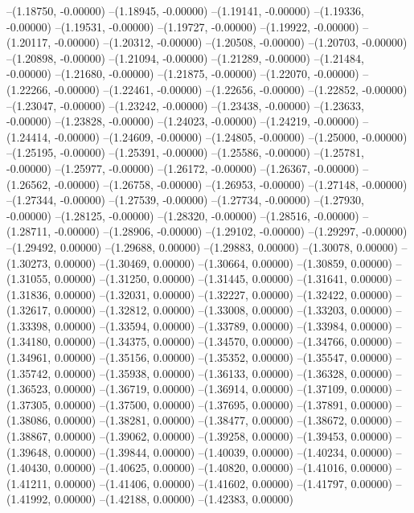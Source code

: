 --(1.18750, -0.00000)
--(1.18945, -0.00000)
--(1.19141, -0.00000)
--(1.19336, -0.00000)
--(1.19531, -0.00000)
--(1.19727, -0.00000)
--(1.19922, -0.00000)
--(1.20117, -0.00000)
--(1.20312, -0.00000)
--(1.20508, -0.00000)
--(1.20703, -0.00000)
--(1.20898, -0.00000)
--(1.21094, -0.00000)
--(1.21289, -0.00000)
--(1.21484, -0.00000)
--(1.21680, -0.00000)
--(1.21875, -0.00000)
--(1.22070, -0.00000)
--(1.22266, -0.00000)
--(1.22461, -0.00000)
--(1.22656, -0.00000)
--(1.22852, -0.00000)
--(1.23047, -0.00000)
--(1.23242, -0.00000)
--(1.23438, -0.00000)
--(1.23633, -0.00000)
--(1.23828, -0.00000)
--(1.24023, -0.00000)
--(1.24219, -0.00000)
--(1.24414, -0.00000)
--(1.24609, -0.00000)
--(1.24805, -0.00000)
--(1.25000, -0.00000)
--(1.25195, -0.00000)
--(1.25391, -0.00000)
--(1.25586, -0.00000)
--(1.25781, -0.00000)
--(1.25977, -0.00000)
--(1.26172, -0.00000)
--(1.26367, -0.00000)
--(1.26562, -0.00000)
--(1.26758, -0.00000)
--(1.26953, -0.00000)
--(1.27148, -0.00000)
--(1.27344, -0.00000)
--(1.27539, -0.00000)
--(1.27734, -0.00000)
--(1.27930, -0.00000)
--(1.28125, -0.00000)
--(1.28320, -0.00000)
--(1.28516, -0.00000)
--(1.28711, -0.00000)
--(1.28906, -0.00000)
--(1.29102, -0.00000)
--(1.29297, -0.00000)
--(1.29492, 0.00000)
--(1.29688, 0.00000)
--(1.29883, 0.00000)
--(1.30078, 0.00000)
--(1.30273, 0.00000)
--(1.30469, 0.00000)
--(1.30664, 0.00000)
--(1.30859, 0.00000)
--(1.31055, 0.00000)
--(1.31250, 0.00000)
--(1.31445, 0.00000)
--(1.31641, 0.00000)
--(1.31836, 0.00000)
--(1.32031, 0.00000)
--(1.32227, 0.00000)
--(1.32422, 0.00000)
--(1.32617, 0.00000)
--(1.32812, 0.00000)
--(1.33008, 0.00000)
--(1.33203, 0.00000)
--(1.33398, 0.00000)
--(1.33594, 0.00000)
--(1.33789, 0.00000)
--(1.33984, 0.00000)
--(1.34180, 0.00000)
--(1.34375, 0.00000)
--(1.34570, 0.00000)
--(1.34766, 0.00000)
--(1.34961, 0.00000)
--(1.35156, 0.00000)
--(1.35352, 0.00000)
--(1.35547, 0.00000)
--(1.35742, 0.00000)
--(1.35938, 0.00000)
--(1.36133, 0.00000)
--(1.36328, 0.00000)
--(1.36523, 0.00000)
--(1.36719, 0.00000)
--(1.36914, 0.00000)
--(1.37109, 0.00000)
--(1.37305, 0.00000)
--(1.37500, 0.00000)
--(1.37695, 0.00000)
--(1.37891, 0.00000)
--(1.38086, 0.00000)
--(1.38281, 0.00000)
--(1.38477, 0.00000)
--(1.38672, 0.00000)
--(1.38867, 0.00000)
--(1.39062, 0.00000)
--(1.39258, 0.00000)
--(1.39453, 0.00000)
--(1.39648, 0.00000)
--(1.39844, 0.00000)
--(1.40039, 0.00000)
--(1.40234, 0.00000)
--(1.40430, 0.00000)
--(1.40625, 0.00000)
--(1.40820, 0.00000)
--(1.41016, 0.00000)
--(1.41211, 0.00000)
--(1.41406, 0.00000)
--(1.41602, 0.00000)
--(1.41797, 0.00000)
--(1.41992, 0.00000)
--(1.42188, 0.00000)
--(1.42383, 0.00000)

